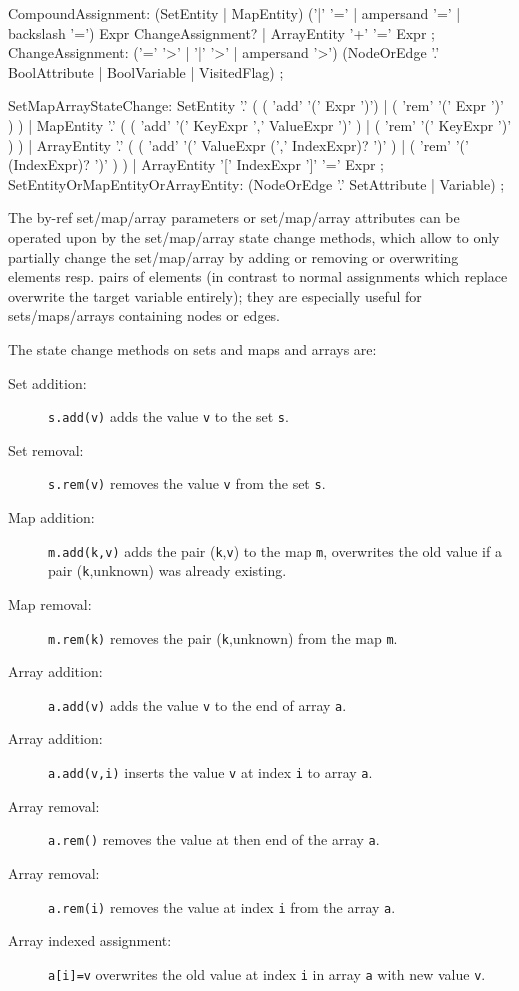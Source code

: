\begin{rail}    
  CompoundAssignment:
    (SetEntity | MapEntity) ('|' '=' | ampersand '=' | backslash '=') Expr ChangeAssignment? |
    ArrayEntity '+' '=' Expr
  ;
  ChangeAssignment:
    ('=' '>' | '|' '>' | ampersand '>') (NodeOrEdge '.' BoolAttribute | BoolVariable | VisitedFlag)
  ;
\end{rail}

\begin{rail}    
  SetMapArrayStateChange:
   	SetEntity '.' ( ( 'add' '(' Expr ')') | ( 'rem' '(' Expr ')' ) ) |
	  MapEntity '.' ( ( 'add' '(' KeyExpr ',' ValueExpr ')' ) | ( 'rem' '(' KeyExpr ')' ) ) |
	  ArrayEntity '.' ( ( 'add' '(' ValueExpr (','  IndexExpr)? ')' ) | ( 'rem' '(' (IndexExpr)? ')' ) ) |
	  ArrayEntity '[' IndexExpr ']' '=' Expr
	;
	SetEntityOrMapEntityOrArrayEntity:
	  (NodeOrEdge '.' SetAttribute | Variable)
	;
\end{rail}

The by-ref set/map/array parameters or set/map/array attributes can be operated upon by the set/map/array state change methods,
which allow to only partially change the set/map/array by adding or removing or overwriting elements resp. pairs of elements (in contrast to normal assignments which replace overwrite the target variable entirely);
they are especially useful for sets/maps/arrays containing nodes or edges.

\noindent The state change methods on sets and maps and arrays are:

\begin{description}
\item[Set addition:] \texttt{s.add(v)} adds the value \texttt{v} to the set \texttt{s}.
\item[Set removal:] \texttt{s.rem(v)} removes the value \texttt{v} from the set \texttt{s}.
\item[Map addition:] \texttt{m.add(k,v)} adds the pair (\texttt{k},\texttt{v}) to the map \texttt{m}, overwrites the old value if a pair (\texttt{k},unknown) was already existing.
\item[Map removal:] \texttt{m.rem(k)} removes the pair (\texttt{k},unknown) from the map \texttt{m}.
\item[Array addition:] \texttt{a.add(v)} adds the value \texttt{v} to the end of array \texttt{a}.
\item[Array addition:] \texttt{a.add(v,i)} inserts the value \texttt{v} at index \texttt{i} to array \texttt{a}.
\item[Array removal:] \texttt{a.rem()} removes the value at then end of the array \texttt{a}.
\item[Array removal:] \texttt{a.rem(i)} removes the value at index \texttt{i} from the array \texttt{a}.
\item[Array indexed assignment:] \texttt{a[i]=v} overwrites the old value at index \texttt{i} in array \texttt{a} with new value \texttt{v}.
\end{description}

